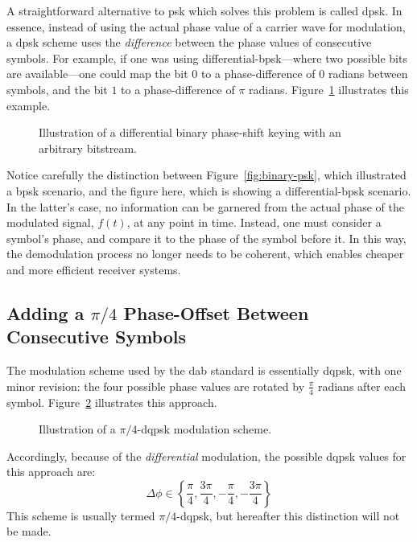 \documentclass[class=report,11pt,crop=false]{standalone}
\begin{document}
A straightforward alternative to \gls{psk} which solves this problem is called \gls{dpsk}. In essence, instead of using the actual phase value of a carrier wave for modulation, a \gls{dpsk} scheme uses the \emph{difference} between the phase values of consecutive symbols. For example, if one was using differential-\gls{bpsk}---where two possible bits are available---one could map the bit \(0\) to a phase-difference of \(0\) radians between symbols, and the bit \(1\) to a phase-difference of \(\pi\) radians. Figure~\ref{fig:differential-binary-psk} illustrates this example.
\begin{figure}[htbp]
    \centering
    \captionsetup{type=figure}
    \def\svgwidth{1\linewidth}
    {\scriptsize
        }
    \caption{Illustration of a differential binary phase-shift keying with an arbitrary bitstream.}
    \label{fig:differential-binary-psk}
\end{figure}
Notice carefully the distinction between Figure~\ref{fig:binary-psk}, which illustrated a \gls{bpsk} scenario, and the figure here, which is showing a differential-\gls{bpsk} scenario. In the latter's case, no information can be garnered from the actual phase of the modulated signal, \(f(t)\), at any point in time. Instead, one must consider a symbol's phase, and compare it to the phase of the symbol before it. In this way, the demodulation process no longer needs to be coherent, which enables cheaper and more efficient receiver systems.

\subsection{Adding a $\pi/4$ Phase-Offset Between Consecutive Symbols}
The modulation scheme used by the \gls{dab} standard is essentially \gls{dqpsk}, with one minor revision: the four possible phase values are rotated by \(\frac{\pi}{4}\) radians after each symbol. Figure~\ref{fig:pi-by-4-dqpsk-illustration} illustrates this approach.
\begin{figure}[htbp]
    \centering
    \captionsetup{type=figure}
    \def\svgwidth{1\linewidth}
    { %
    \scriptsize
    }
    \caption{Illustration of a \(\pi/4\)-\gls{dqpsk} modulation scheme.}
    \label{fig:pi-by-4-dqpsk-illustration}
\end{figure}

Accordingly, because of the \emph{differential} modulation, the possible \gls{dqpsk} values for this approach are:
\begin{equation}
    \Delta\phi \in \left\{ \frac{\pi}{4}, \frac{3\pi}{4}, -\frac{\pi}{4}, -\frac{3\pi}{4} \right\}
\end{equation}
This scheme is usually termed \(\pi/4\)-\gls{dqpsk}, but hereafter this distinction will not be made.
\end{document}
